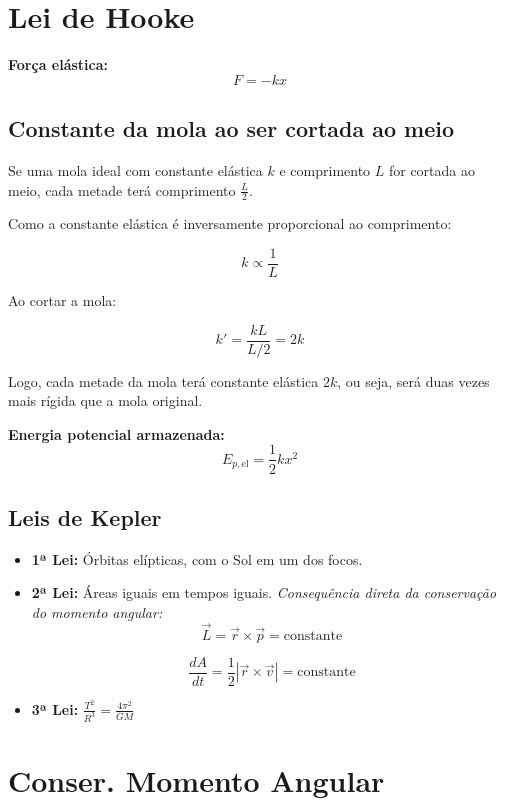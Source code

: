 \documentclass[a4paper,12pt]{article}
\begin{document}
\begin{multicols}{2}
\section{Lei de Hooke}

\textbf{Força elástica:}
\begin{equation*}
  F = -k x
\end{equation*}

\subsection{Constante da mola ao ser cortada ao meio}

Se uma mola ideal com constante elástica \( k \) e comprimento \( L \) for cortada ao meio, cada metade terá comprimento \( \frac{L}{2} \).

Como a constante elástica é inversamente proporcional ao comprimento:

\[
k \propto \frac{1}{L}
\]

Ao cortar a mola:

\[
k' = \frac{kL}{L/2} = 2k
\]

Logo, cada metade da mola terá constante elástica \( 2k \), ou seja, será duas vezes mais rígida que a mola original.

\textbf{Energia potencial armazenada:}
\begin{equation*}
  E_{p,\text{el}} = \frac{1}{2} k x^2
\end{equation*}

\subsection{Leis de Kepler}

\begin{itemize}
  \item \textbf{1ª Lei:} Órbitas elípticas, com o Sol em um dos focos.
  \item \textbf{2ª Lei:} Áreas iguais em tempos iguais. \textit{Consequência direta da 
  conservação do momento angular:}
        \[
        \vec{L} = \vec{r} \times \vec{p} = \text{constante}
        \]

        \[ \frac{dA}{dt} = \frac{1}{2} |\vec{r} \times \vec{v}| = \text{constante} \]

  \item \textbf{3ª Lei:} \( \frac{T^2}{R^3} = \frac{4 \pi^2}{GM}  \)
\end{itemize}

\section{Conser. Momento Angular}


\end{multicols}
\end{document}
